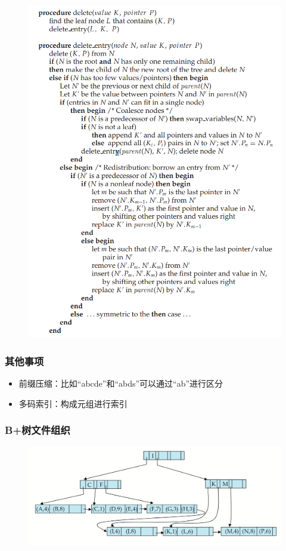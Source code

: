 \begin{figure}[H]
\centering
\includegraphics[width=0.7\linewidth]{fig/bp-tree_deletion_alg.png}
\end{figure}

\subsubsection{其他事项}
\begin{itemize}
	\item 前缀压缩：比如``abcde''和``abds''可以通过``ab''进行区分
	\item 多码索引：构成元组进行索引
\end{itemize}

\subsubsection{B+树文件组织}
\begin{figure}[H]
\centering
\includegraphics[width=0.8\linewidth]{fig/bp-tree_file_organization.png}
\end{figure}

